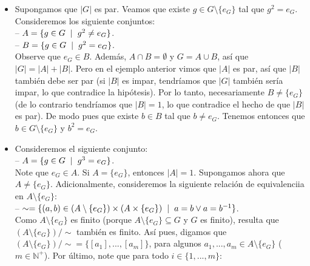 \documentclass[10 pt]{article}
\begin{document}
\begin{itemize}
    \item \Large{Supongamos que $|G|$ es par. Veamos que existe $g \in G \setminus \{e_G\}$ tal que $g^2=e_G$. Consideremos los siguiente conjuntos: \\

    -- $A=\{g \in G \hspace{0.2cm}|\hspace{0.2 cm}g^2 \neq e_G\}$. \\

    -- $B=\{g \in G \hspace{0.2 cm}|\hspace{0.2 cm}g^2=e_G\}$. \\

    Observe que $e_G \in B$. Además, $A \cap B=\emptyset$ y $G=A \cup B$, así que $|G|=|A|+|B|$. Pero en el ejemplo anterior vimos que $|A|$ es par, así que $|B|$ también debe ser par (si $|B|$ es impar, tendríamos que $|G|$ también sería impar, lo que contradice la hipótesis). Por lo tanto, necesariamente $B \neq \{e_G\}$ (de lo contrario tendríamos que $|B|=1$, lo que contradice el hecho de que $|B|$ es par). De modo pues que existe $b \in B$ tal que $b \neq e_G$. Tenemos entonces que $b \in G \setminus \{e_G\}$ y $b^2=e_G$.} \\

    \item \Large{Consideremos el siguiente conjunto: \\

    -- $A=\{g \in G \hspace{0.2 cm}|\hspace{0.2 cm}g^3=e_G\}$. \\

    Note que $e_G \in A$. Si $A=\{e_G\}$, entonces $|A|=1$. Supongamos ahora que $A \neq \{e_G\}$. Adicionalmente, consideremos la siguiente relación de equivalenciia en $A \setminus \{e_G\}$: \\

    -- $\sim=\{(a,b) \in (A \setminus \{e_G\}) \times (A \times \{e_G\}) \hspace{0.2 cm}|\hspace{0.2 cm}a=b \lor a=b^{-1}\}$. \\

    Como $A \setminus \{e_G\}$ es finito (porque $A \setminus \{e_G\} \subseteq G$ y $G$ es finito), resulta que $(A \setminus \{e_G\})/\sim$ también es finito. Así pues, digamos que $(A \setminus \{e_G\})/\sim=\{[a_1],...,[a_m]\}$, para algunos $a_1,...,a_m \in A \setminus \{e_G\}$ ($m \in \mathbb N^+$). Por último, note que para todo $i \in \{1,...,m\}$: \\

}
\end{itemize}
\end{document}
